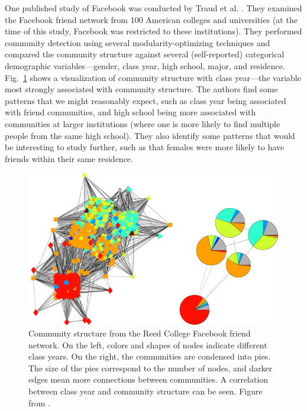 One published study of Facebook was conducted by Traud et al.
\autocite{traud_social_2012}. They examined the Facebook friend network
from 100 American colleges and universities (at the time of this study,
Facebook was restricted to these institutions). They performed community
detection using several modularity-optimizing techniques and compared
the community structure against several (self-reported) categorical
demographic variables---gender, class year, high school, major, and
residence. Fig.~\ref{fig:facebook} shows a visualization of community
structure with class year---the variable most strongly associated with
community structure. The authors find some patterns that we might
reasonably expect, such as class year being associated with friend
communities, and high school being more associated with communities at
larger institutions (where one is more likely to find multiple people
from the same high school). They also identify some patterns that would
be interesting to study further, such as that females were more likely
to have friends within their same residence.

\begin{figure}
\centering
\includegraphics{img/traud2012_fig2_facebook.jpg}
\caption{Community structure from the Reed College Facebook friend
network. On the left, colors and shapes of nodes indicate different
class years. On the right, the communities are condensed into pies. The
size of the pies correspond to the number of nodes, and darker edges
mean more connections between communities. A correlation between class
year and community structure can be seen. Figure from
\autocite{traud_social_2012}.}\label{fig:facebook}
\end{figure}

